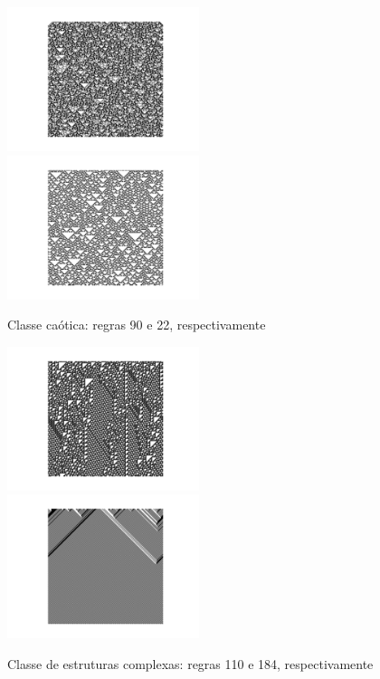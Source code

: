 \begin{figure}[htb]
  \caption{Classe caótica: regras 90 e 22, respectivamente}
  \includegraphics[width=0.5\textwidth]{figures/90.pdf}
  \includegraphics[width=0.5\textwidth]{figures/22.pdf}
  \label{fig:wolfram_chaotic}
\end{figure}

\begin{figure}[htb]
  \caption{Classe de estruturas complexas: regras 110 e 184, respectivamente}
  \includegraphics[width=0.5\textwidth]{figures/110.pdf}
  \includegraphics[width=0.5\textwidth]{figures/184.pdf}
  \label{fig:wolfram_complex}
\end{figure}
